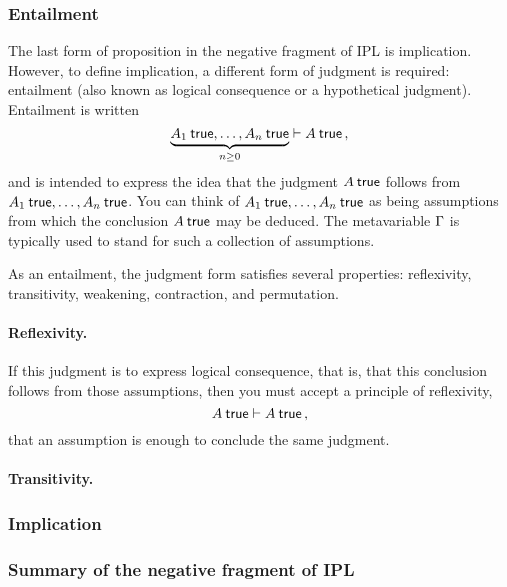 \documentclass[12pt]{article}
\begin{document}
\subsubsection{Entailment}\label{sec:entailment}

The last form of proposition in the negative fragment of \gls{IPL} is implication.
However, to define implication, a different form of judgment is required: entailment (also known as logical consequence or a hypothetical judgment).
Entailment is written
\begin{equation*}
  \underbrace{A_1 \true, \dotsc, A_n \true}_{n \geq 0} \entails A \true \,,
\end{equation*}
and is intended to express the idea that the judgment $A \true$ follows from $A_1 \true, \dotsc, A_n \true$.
You can think of $A_1 \true, \dotsc, A_n \true$ as being assumptions from which the conclusion $A \true$ may be deduced.
The metavariable $\Gamma$ is typically used to stand for such a collection of assumptions.

As an entailment, the judgment form satisfies several properties: reflexivity, transitivity, weakening, contraction, and permutation.

\paragraph{Reflexivity.}\label{sec:reflexivity}
If this judgment is to express logical consequence, that is, that this conclusion follows from those assumptions, then you must accept a principle of reflexivity,
\begin{equation*}
  A \true \entails A \true \,,
\end{equation*}
that an assumption is enough to conclude the same judgment.

\paragraph{Transitivity.}\label{sec:transitivity}


\subsubsection{Implication}\label{sec:implication}

\subsubsection{Summary of the negative fragment of \gls{IPL}}\label{sec:summary-negative}
\end{document}
